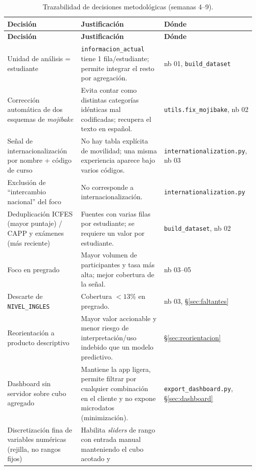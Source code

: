 \documentclass[12pt,a4paper]{article}
\begin{document}
\renewcommand{\arraystretch}{1.25}
\begin{longtable}{>{\raggedright\arraybackslash}p{4.3cm}
                  >{\raggedright\arraybackslash}p{7.3cm}
                  >{\raggedright\arraybackslash}p{2.8cm}}
\caption{Trazabilidad de decisiones metodológicas (semanas 4--9).}
\label{tab:decisiones}\\
\toprule
\textbf{Decisión} & \textbf{Justificación} & \textbf{Dónde} \\
\midrule
\endfirsthead
\toprule
\textbf{Decisión} & \textbf{Justificación} & \textbf{Dónde} \\
\midrule
\endhead
Unidad de análisis = estudiante &
\texttt{informacion\_actual} tiene 1 fila/estudiante; permite integrar el resto por
agregación. & nb 01, \texttt{build\_dataset} \\
Corrección automática de dos esquemas de \emph{mojibake} &
Evita contar como distintas categorías idénticas mal codificadas; recupera el
texto en español. & \texttt{utils.fix\_mojibake}, nb 02 \\
Señal de internacionalización por nombre + código de curso &
No hay tabla explícita de movilidad; una misma experiencia aparece bajo varios
códigos. & \texttt{internationalization.py}, nb 03 \\
Exclusión de ``intercambio nacional'' del foco &
No corresponde a internacionalización. & \texttt{internationalization.py} \\
Deduplicación ICFES (mayor puntaje) / CAPP y exámenes (más reciente) &
Fuentes con varias filas por estudiante; se requiere un valor por estudiante. &
\texttt{build\_dataset}, nb 02 \\
Foco en pregrado &
Mayor volumen de participantes y tasa más alta; mejor cobertura de la señal. &
nb 03--05 \\
Descarte de \texttt{NIVEL\_INGLES} &
Cobertura $<13\%$ en pregrado. & nb 03, \S\ref{sec:faltantes} \\
Reorientación a producto descriptivo &
Mayor valor accionable y menor riesgo de interpretación/uso indebido que un modelo
predictivo. & \S\ref{sec:reorientacion} \\
Dashboard sin servidor sobre cubo agregado &
Mantiene la app ligera, permite filtrar por cualquier combinación en el cliente y
no expone microdatos (minimización). & \texttt{export\_dashboard.py}, \S\ref{sec:dashboard} \\
Discretización fina de variables numéricas (rejilla, no rangos fijos) &
Habilita \emph{sliders} de rango con entrada manual manteniendo el cubo acotado y

\end{longtable}
\end{document}
